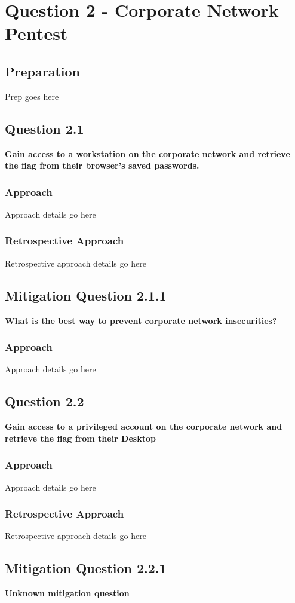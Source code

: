 \chapter{Question 2 - Corporate Network Pentest}

\section{Preparation}
Prep goes here

\section{Question 2.1}
\textbf{Gain access to a workstation on the corporate network and retrieve the
flag from their browser's saved passwords.}
\subsection{Approach}
Approach details go here
\subsection{Retrospective Approach}
Retrospective approach details go here

\section{Mitigation Question 2.1.1}
\textbf{What is the best way to prevent corporate network insecurities?}
\subsection{Approach}
Approach details go here

\section{Question 2.2}
\textbf{Gain access to a privileged account on the corporate network and
retrieve the flag from their Desktop}
\subsection{Approach}
Approach details go here
\subsection{Retrospective Approach}
Retrospective approach details go here

\section{Mitigation Question 2.2.1}
\textbf{Unknown mitigation question}
